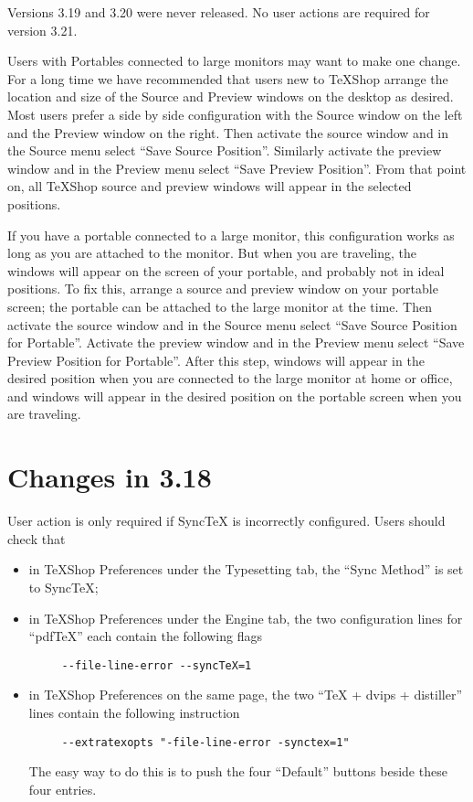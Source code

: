 \documentclass[11pt, oneside]{amsart}
\begin{document}
Versions 3.19 and 3.20 were never released. No user actions are required for version 3.21.

Users with Portables connected to large monitors may want to make one change. For a  long time we have recommended that users new to
TeXShop  arrange the location and size of the Source and Preview windows on the desktop as desired. Most users prefer a side by side configuration with the Source window on the left and the Preview window on the right. Then activate the source
window and in the Source menu select ``Save Source Position''. Similarly activate the preview window and in the Preview menu select ``Save Preview Position''. From that point on, all
TeXShop source and preview windows will appear in the selected positions.

If you have a portable connected to a large monitor, this configuration works as long as you are attached to the monitor. But when you are traveling, the windows will appear on the screen of your portable, and probably not in ideal positions. To fix this, arrange a source and preview window on your portable screen; the portable can be attached to the large monitor at the time. Then activate the source window and in the Source menu select ``Save Source Position for Portable''. Activate the preview window and in the Preview menu select ``Save Preview Position for Portable''. After this step, windows will appear in the desired position when you are connected to the large monitor at home or office, and windows will appear in the desired position on the portable screen when you are traveling.


\section{Changes in 3.18}

User action is only required if SyncTeX is incorrectly configured. Users should
check that
\begin{itemize}
\item in TeXShop Preferences under the Typesetting tab, the ``Sync Method'' is set to SyncTeX;
\item in TeXShop Preferences under the Engine tab, the two configuration lines for ``pdfTeX''
each contain the following flags
\begin{verbatim}
     --file-line-error --syncTeX=1
\end{verbatim}
\item in TeXShop Preferences on the same page, the two ``TeX + dvips + distiller'' lines
contain the following instruction
\begin{verbatim}
     --extratexopts "-file-line-error -synctex=1"
\end{verbatim}
	The easy way to do this is to push the four ``Default'' buttons beside these four entries.
\end{itemize}
\end{document}

